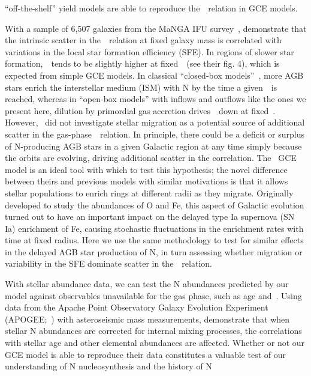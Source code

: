 ``off-the-shelf'' yield models are able to reproduce the~\ohno~relation in
GCE models.
\par
With a sample of 6,507 galaxies from the MaNGA IFU survey~\citep{Bundy2015},
\citet{Schaefer2020} demonstrate that the intrinsic scatter in
the~\ohno~relation at fixed galaxy mass is correlated with variations in the
local star formation efficiency (SFE).
In regions of slower star formation,~\no~tends to be slightly higher at
fixed~\oh~(see their fig. 4), which is expected from simple GCE models.
In classical ``closed-box models''~\citep[e.g.][]{Molla2006}, more AGB stars
enrich the interstellar medium (ISM) with N by the time a given~\oh~is reached,
whereas in ``open-box models'' with inflows and outflows like the ones we
present here, dilution by primordial gas accretion drives~\oh~down at fixed~\no.
However,~\citet{Schaefer2020} did not investigate stellar migration as a
potential source of additional scatter in the gas-phase~\ohno~relation.
In principle, there could be a deficit or surplus of N-producing AGB stars in a
given Galactic region at any time simply because the orbits are evolving,
driving additional scatter in the correlation.
The~\citet{Johnson2021} GCE model is an ideal tool with which to test this
hypothesis; the novel difference between theirs and previous models with
similar motivations is that it allows stellar populations to enrich
rings at different radii as they migrate.
Originally developed to study the abundances of O and Fe, this aspect of
Galactic evolution turned out to have an important impact on the delayed type
Ia supernova (SN Ia) enrichment of Fe, causing stochastic fluctuations in the
enrichment rates with time at fixed radius.
Here we use the same methodology to test for similar effects in the delayed AGB
star production of N, in turn assessing whether migration or variability in the
SFE dominate scatter in the~\ohno~relation.
\par
With stellar abundance data, we can test the N abundances predicted by our
model against observables unavailable for the gas phase, such as age and~\ofe.
Using data from the Apache Point Observatory Galaxy Evolution Experiment
(APOGEE;~\citealp{Majewski2017}) with asteroseismic mass measurements,
\citet{Vincenzo2021b} demonstrate that when stellar N abundances are corrected
for internal mixing processes, the correlations with stellar age and other
elemental abundances are affected.
Whether or not our GCE model is able to reproduce their data constitutes a
valuable test of our understanding of N nucleosynthesis and the history of N
